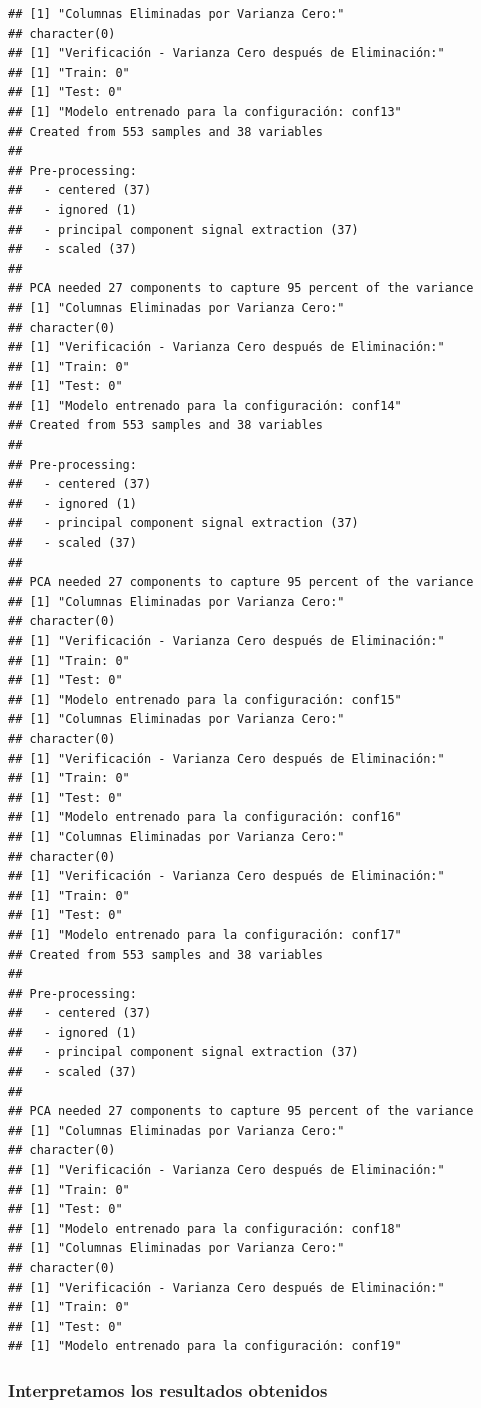 \documentclass[
]{article}
\begin{document}
\begin{verbatim}
## [1] "Columnas Eliminadas por Varianza Cero:"
## character(0)
## [1] "Verificación - Varianza Cero después de Eliminación:"
## [1] "Train: 0"
## [1] "Test: 0"
## [1] "Modelo entrenado para la configuración: conf13"
## Created from 553 samples and 38 variables
## 
## Pre-processing:
##   - centered (37)
##   - ignored (1)
##   - principal component signal extraction (37)
##   - scaled (37)
## 
## PCA needed 27 components to capture 95 percent of the variance
## [1] "Columnas Eliminadas por Varianza Cero:"
## character(0)
## [1] "Verificación - Varianza Cero después de Eliminación:"
## [1] "Train: 0"
## [1] "Test: 0"
## [1] "Modelo entrenado para la configuración: conf14"
## Created from 553 samples and 38 variables
## 
## Pre-processing:
##   - centered (37)
##   - ignored (1)
##   - principal component signal extraction (37)
##   - scaled (37)
## 
## PCA needed 27 components to capture 95 percent of the variance
## [1] "Columnas Eliminadas por Varianza Cero:"
## character(0)
## [1] "Verificación - Varianza Cero después de Eliminación:"
## [1] "Train: 0"
## [1] "Test: 0"
## [1] "Modelo entrenado para la configuración: conf15"
## [1] "Columnas Eliminadas por Varianza Cero:"
## character(0)
## [1] "Verificación - Varianza Cero después de Eliminación:"
## [1] "Train: 0"
## [1] "Test: 0"
## [1] "Modelo entrenado para la configuración: conf16"
## [1] "Columnas Eliminadas por Varianza Cero:"
## character(0)
## [1] "Verificación - Varianza Cero después de Eliminación:"
## [1] "Train: 0"
## [1] "Test: 0"
## [1] "Modelo entrenado para la configuración: conf17"
## Created from 553 samples and 38 variables
## 
## Pre-processing:
##   - centered (37)
##   - ignored (1)
##   - principal component signal extraction (37)
##   - scaled (37)
## 
## PCA needed 27 components to capture 95 percent of the variance
## [1] "Columnas Eliminadas por Varianza Cero:"
## character(0)
## [1] "Verificación - Varianza Cero después de Eliminación:"
## [1] "Train: 0"
## [1] "Test: 0"
## [1] "Modelo entrenado para la configuración: conf18"
## [1] "Columnas Eliminadas por Varianza Cero:"
## character(0)
## [1] "Verificación - Varianza Cero después de Eliminación:"
## [1] "Train: 0"
## [1] "Test: 0"
## [1] "Modelo entrenado para la configuración: conf19"
\end{verbatim}

\hypertarget{interpretamos-los-resultados-obtenidos}{%
\subsubsection{Interpretamos los resultados
obtenidos}\label{interpretamos-los-resultados-obtenidos}}
\end{document}
